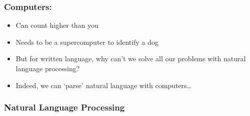 \documentclass[aspectratio=169]{beamer} %
\begin{document}
\begin{frame}
\frametitle{Computers:}

\begin{itemize}
  \item Can count higher than you
  \item Needs to be a supercomputer to identify a dog
\end{itemize}
\end{frame}

\begin{frame}
  \begin{itemize}
    \item But for written language, why can't we solve all our problems with natural language processing?
    \item Indeed, we can `parse' natural language with computers\ldots
  \end{itemize}
\end{frame}

\begin{frame}
\frametitle{Natural Language Processing}

\end{frame}
\end{document}
